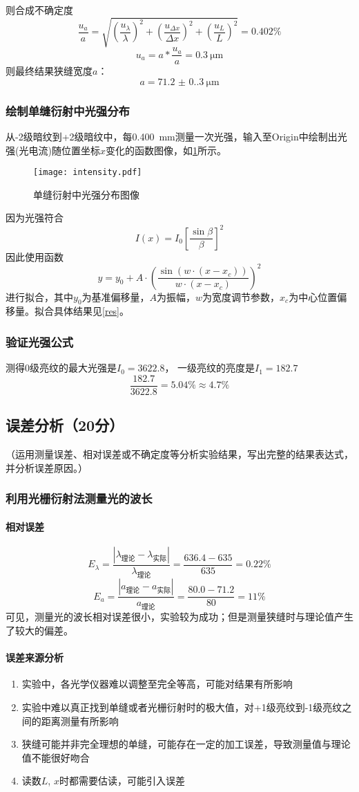 \documentclass[]{../template/Report}%
\begin{document}
\begin{fullreportonly}
则合成不确定度
\[
\frac{u_a}{a} = \sqrt{\left(\frac{u_\lambda}{\lambda}\right)^2 + \left(\frac{u_{\Delta x}}{\Delta x}\right)^2 + \left(\frac{u_{L}}{L}\right)^2} = 0.402\%
\]
\[
u_a = a * \frac{u_a}{a} = \SI{0.3}{\micro \meter}
\]
则最终结果狭缝宽度$a$：
\[
a = \SI{71.2(0.3)}{\micro \meter}
\]
\subsubsection{绘制单缝衍射中光强分布}
从-2级暗纹到+2级暗纹中，每\SI{0.400}{\mm}测量一次光强，输入至\textrm{Origin}中绘制出光强(光电流)随位置坐标$x$变化的函数图像，如\cref{fig:intensity}所示。
\begin{figure}[H]
    \centering
    \texttt{[image: intensity.pdf]}
    \caption{单缝衍射中光强分布图像}
    \label{fig:intensity}
\end{figure}
因为光强符合
\[
I(x) = I_0\left[\frac{\sin \beta}{\beta}\right]^2
\]
因此使用函数
\[
y = y_0 + A\cdot\left(\frac{\sin(w \cdot (x - x_c))}{w \cdot (x - x_c)}\right)^2
\]
进行拟合，其中$y_0$为基准偏移量，$A$为振幅，$w$为宽度调节参数，$x_c$为中心位置偏移量。拟合具体结果见\cref{res}。
\subsubsection{验证光强公式}
测得0级亮纹的最大光强是$I_0 = 3622.8$， 一级亮纹的亮度是$I_1 = 182.7$
\[
\frac{182.7}{3622.8} = 5.04\% \approx 4.7\%
\]
\subsection{误差分析（20分）}
（运用测量误差、相对误差或不确定度等分析实验结果，写出完整的结果表达式，并分析误差原因。）
\subsubsection{利用光栅衍射法测量光的波长}
\paragraph{相对误差}
\[E_\lambda = \frac{\left|\lambda_\text{理论} - \lambda_\text{实际}\right|}{\lambda_\text{理论}} = \frac{636.4 - 635}{635} = 0.22\%\]
\[E_a = \frac{\left|a_\text{理论} - a_\text{实际}\right|}{a_\text{理论}} = \frac{80.0 - 71.2}{80} = 11\%\]
可见，测量光的波长相对误差很小，实验较为成功；但是测量狭缝时与理论值产生了较大的偏差。
\paragraph{误差来源分析}
\begin{enumerate}
    \item 实验中，各光学仪器难以调整至完全等高，可能对结果有所影响
    \item 实验中难以真正找到单缝或者光栅衍射时的极大值，对+1级亮纹到-1级亮纹之间的距离测量有所影响
    \item 狭缝可能并非完全理想的单缝，可能存在一定的加工误差，导致测量值与理论值不能很好吻合
    \item 读数$L$, $x$时都需要估读，可能引入误差
\end{enumerate}

\end{fullreportonly}
\end{document}
